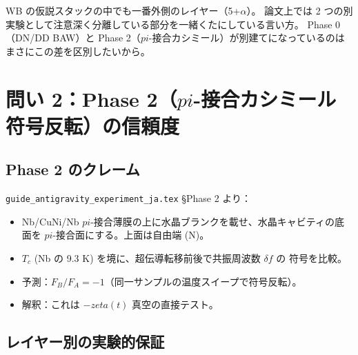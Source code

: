 \documentclass[11pt,a4paper]{article}
\def\pi{pi}%
\def\zeta{zeta}%
\def\textbf#1{#1}%
\begin{document}
\begin{tcolorbox}[colback=yellow!5,colframe=orange!60!black,title=要点]
WB の仮説スタックの中でも一番外側のレイヤー（5+$\alpha$）。
論文上では 2 つの別実験として注意深く分離している部分を一緒くたにしている言い方。
Phase 0（DN/DD BAW）と Phase 2（$\pi$-接合カシミール）が別建てになっているのは
まさにこの差を区別したいから。
\end{tcolorbox}

\section{問い 2：Phase 2（$\pi$-接合カシミール符号反転）の信頼度}

\subsection{Phase 2 のクレーム}

\texttt{guide\_antigravity\_experiment\_ja.tex} \S Phase 2 より：

\begin{itemize}
\item Nb/CuNi/Nb $\pi$-接合薄膜の上に水晶ブランクを載せ、水晶キャビティの底面を
  $\pi$-接合面にする。上面は自由端 (N)。
\item $T_c$ (Nb の 9.3 K) を境に、超伝導転移前後で共振周波数 $\delta f$ の
  \textbf{符号}を比較。
\item 予測：$F_B/F_A = -1$（同一サンプルの温度スイープで符号反転）。
\item 解釈：これは $-\zeta(t)$ 真空の直接テスト。
\end{itemize}

\subsection{レイヤー別の実験的保証}
\end{document}
